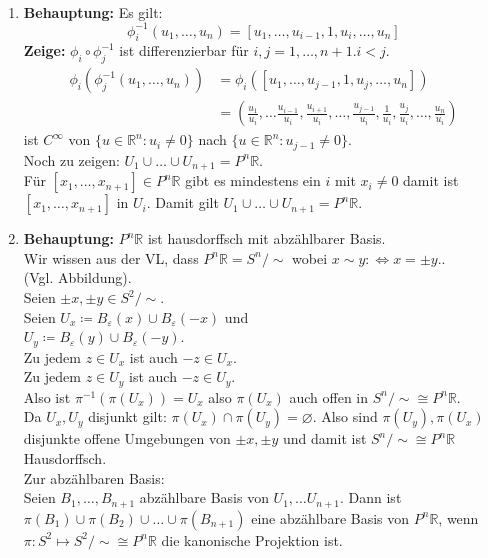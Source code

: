 \begin{solution}
  \
  \begin{enumerate}[label= (\alph*)]
    \item \textbf{Behauptung:} Es gilt:
    \begin{equation*}
      \phi_i^{-1} (u_1, \dots , u_{n}) = [u_1, \dots , u_{i-1}, 1, u_i, \dots , u_n]
    \end{equation*}
    \textbf{Zeige:} \( \phi_i \circ \phi^{-1}_j \) ist differenzierbar für \( i,j = 1, \dots, n+1. i < j \).
    \begin{align*}
      \phi_i (\phi_j^{-1} (u_1, \dots , u_{n})) &= \phi_i([u_1, \dots , u_{j-1}, 1, u_j, \dots , u_n]) \\
      &= \left( 
      \frac{u_1}{u_i}, \dots \frac{u_{i-1}}{u_i}, \frac{u_{i+1}}{u_i}, \dots , \frac{u_{j-1}}{u_i}, \frac{1}{u_i}, \frac{u_{j}}{u_i}, \dots, \frac{u_n}{u_i} 
      \right)
    \end{align*}
    ist \( C^{\infty} \) von \( \{ u \in \mathbb{R}^n : u_i \neq 0 \} \) nach \( \{ u \in \mathbb{R}^n : u_{j-1} \neq 0 \} \). \\
    Noch zu zeigen: \( U_1 \cup \dots \cup U_{n+1} = P^n\mathbb{R} \). \\
    Für \( [x_1, \dots , x_{n+1}] \in P^n\mathbb{R} \) gibt es mindestens ein \( i \) mit \( x_i \neq 0 \) damit ist \( [x_1, \dots , x_{n+1}] \) in \( U_i \). Damit gilt \( U_1 \cup \dots \cup U_{n+1} = P^n\mathbb{R} \).
    
    \item \textbf{Behauptung:} \( P^n\mathbb{R} \) ist hausdorffsch mit abzählbarer Basis. \\
    Wir wissen aus der VL, dass \( P^n\mathbb{R} = S^n / \sim \) wobei \( x \sim y :\Leftrightarrow x = \pm y. \). \\
    (Vgl. Abbildung). \\
    Seien \( \pm x, \pm y \in S^2 / \sim \). \\
    Seien \( U_x \coloneqq B_\varepsilon(x) \cup B_\varepsilon(-x) \) und \\
    \( U_y \coloneqq B_\varepsilon(y) \cup B_\varepsilon(-y) \). \\
    Zu jedem \( z \in U_x \) ist auch \( -z \in U_x \). \\
    Zu jedem \( z \in U_y \) ist auch \( -z \in U_y \). \\
    Also ist \( \pi^{-1} (\pi(U_x)) = U_x \) also \( \pi(U_x) \) auch offen in \( S^n / \sim \cong P^n\mathbb{R} \). \\
    Da \( U_x, U_y \) disjunkt gilt: \( \pi(U_x) \cap \pi(U_y) = \varnothing \). Also sind \( \pi(U_y), \pi(U_x) \) disjunkte offene Umgebungen von \( \pm x, \pm y \) und damit ist \( S^n / \sim \cong P^n\mathbb{R} \) Hausdorffsch. \\
    Zur abzählbaren Basis: \\
    Seien \( B_1, \dots, B_{n+1} \) abzählbare Basis von \( U_1, \dots U_{n+1} \). Dann ist \(\pi( B_1) \cup \pi( B_2 ) \cup \dots \cup \pi(B_{n+1}) \) eine abzählbare Basis von \( P^n\mathbb{R} \), wenn \( \pi: S^2 \mapsto S^2/ \sim \cong P^n\mathbb{R} \) die kanonische Projektion ist.
  \end{enumerate}
\end{solution}



